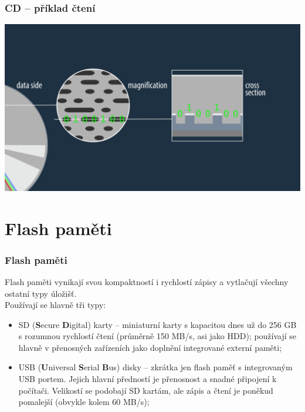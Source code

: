 \documentclass[aspectratio=169,11pt,svgnames]{beamer}
\begin{document}
\begin{frame}
 \frametitle{CD -- příklad čtení}
 \begin{center}
  \includegraphics[width=.8\textwidth]{cd_reading}
 \end{center}
\end{frame}

\section{Flash paměti}

\begin{frame}
 \frametitle{Flash paměti}
 Flash paměti vynikají svou kompaktností i rychlostí zápisy a vytlačují všechny
 ostatní typy úložišť.\\
 \pause
 Používají se hlavně tři typy:
 \begin{itemize}[label=\textbullet]
  \item SD (\textbf{S}ecure \textbf{D}igital) karty -- miniaturní karty s
   kapacitou dnes už do 256 GB s rozumnou rychlostí čtení (průměrně 150 MB/s,
   asi jako HDD); používají se hlavně v přenosných zařízeních jako doplnění
   integrované externí paměti;
  \pause
 \item USB (\textbf{U}niversal \textbf{S}erial \textbf{B}us) disky -- zkrátka
  jen flash paměť s integrovaným USB portem. Jejich hlavní předností je
  přenosnost a snadné připojení k počítači. Velikostí se podobají SD kartám, ale
  zápis a čtení je poněkud pomalejší (obvykle kolem 60 MB/s);
 \end{itemize}
\end{frame}
\end{document}

